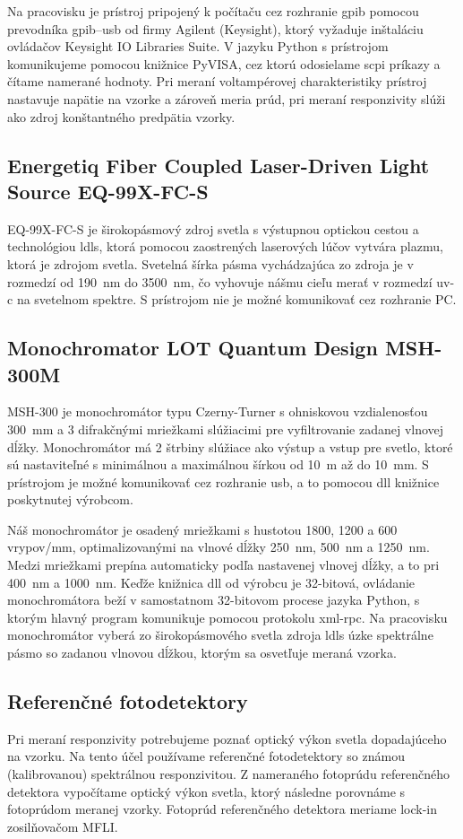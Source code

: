 \documentclass[12pt,a4paper]{article}
\begin{document}
Na pracovisku je prístroj pripojený k počítaču cez rozhranie \ac{gpib} pomocou prevodníka \ac{gpib}--\acs{usb} od firmy Agilent (Keysight), ktorý vyžaduje inštaláciu ovládačov Keysight IO Libraries Suite. V jazyku Python s prístrojom komunikujeme pomocou knižnice PyVISA, cez ktorú odosielame \ac{scpi} príkazy a čítame namerané hodnoty. Pri meraní voltampérovej charakteristiky prístroj nastavuje napätie na vzorke a zároveň meria prúd, pri meraní responzivity slúži ako zdroj konštantného predpätia vzorky.

\subsection{Energetiq Fiber Coupled Laser-Driven Light Source EQ-99X-FC-S}
EQ-99X-FC-S je širokopásmový zdroj svetla s výstupnou optickou cestou a technológiou \ac{ldls}, ktorá pomocou zaostrených laserových lúčov vytvára plazmu, ktorá je zdrojom svetla. Svetelná šírka pásma vychádzajúca zo zdroja je v rozmedzí od 190~nm do 3500~nm, čo vyhovuje nášmu cieľu merať v rozmedzí \ac{uv-c} na svetelnom spektre. S prístrojom nie je možné komunikovať cez rozhranie PC.

\newpage
\subsection{Monochromator LOT Quantum Design MSH-300M}
MSH-300 je monochromátor typu Czerny-Turner s ohniskovou vzdialenosťou 300~mm a 3 difrakčnými mriežkami slúžiacimi pre vyfiltrovanie zadanej vlnovej dĺžky. Monochromátor má 2 štrbiny slúžiace ako výstup a vstup pre svetlo, ktoré sú nastaviteľné s minimálnou a maximálnou šírkou od 10~\textmu m až do 10~mm. S prístrojom je možné komunikovať cez rozhranie \ac{usb}, a to pomocou \ac{dll} knižnice poskytnutej výrobcom.

Náš monochromátor je osadený mriežkami s hustotou 1800, 1200 a 600 vrypov/mm, optimalizovanými na vlnové dĺžky 250~nm, 500~nm a 1250~nm. Medzi mriežkami prepína automaticky podľa nastavenej vlnovej dĺžky, a to pri 400~nm a 1000~nm. Keďže knižnica \ac{dll} od výrobcu je 32-bitová, ovládanie monochromátora beží v samostatnom 32-bitovom procese jazyka Python, s ktorým hlavný program komunikuje pomocou protokolu \ac{xml-rpc}. Na pracovisku monochromátor vyberá zo širokopásmového svetla zdroja \ac{ldls} úzke spektrálne pásmo so zadanou vlnovou dĺžkou, ktorým sa osvetľuje meraná vzorka.

\subsection{Referenčné fotodetektory}
Pri meraní responzivity potrebujeme poznať optický výkon svetla dopadajúceho na vzorku. Na tento účel používame referenčné fotodetektory so známou (kalibrovanou) spektrálnou responzivitou. Z nameraného fotoprúdu referenčného detektora vypočítame optický výkon svetla, ktorý následne porovnáme s fotoprúdom meranej vzorky. Fotoprúd referenčného detektora meriame lock-in zosilňovačom MFLI.
\end{document}
